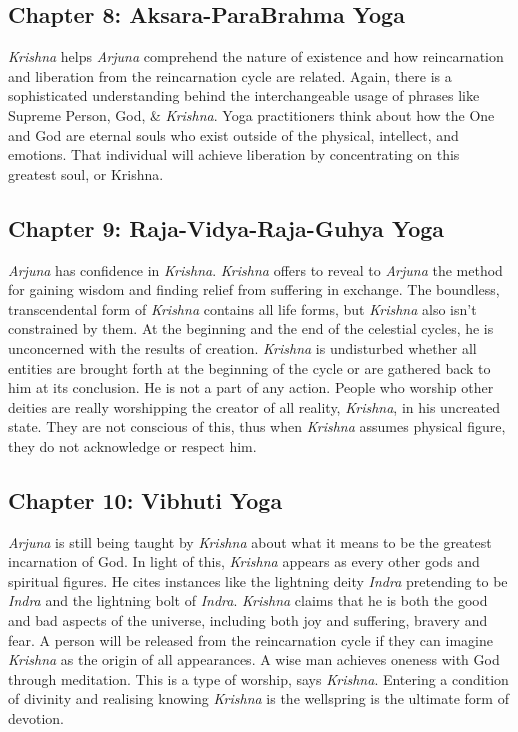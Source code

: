 \documentclass[runningheads]{llncs}
\begin{document}
\subsection{Chapter 8: Aksara-ParaBrahma Yoga}
\textit{Krishna} helps \textit{Arjuna} comprehend the nature of existence and how reincarnation and liberation from the reincarnation cycle are related. Again, there is a sophisticated understanding behind the interchangeable usage of phrases like Supreme Person, God, \& \textit{Krishna}. Yoga practitioners think about how the One and God are eternal souls who exist outside of the physical, intellect, and emotions. That individual will achieve liberation by concentrating on this greatest soul, or Krishna.
\subsection{Chapter 9: Raja-Vidya-Raja-Guhya Yoga}
\textit{Arjuna} has confidence in \textit{Krishna}. \textit{Krishna} offers to reveal to \textit{Arjuna} the method for gaining wisdom and finding relief from suffering in exchange. The boundless, transcendental form of \textit{Krishna} contains all life forms, but \textit{Krishna} also isn't constrained by them. At the beginning and the end of the celestial cycles, he is unconcerned with the results of creation. \textit{Krishna} is undisturbed whether all entities are brought forth at the beginning of the cycle or are gathered back to him at its conclusion. He is not a part of any action. People who worship other deities are really worshipping the creator of all reality, \textit{Krishna}, in his uncreated state. They are not conscious of this, thus when \textit{Krishna} assumes physical figure, they do not acknowledge or respect him.
\subsection{Chapter 10: 	Vibhuti Yoga}
\textit{Arjuna} is still being taught by \textit{Krishna} about what it means to be the greatest incarnation of God. In light of this, \textit{Krishna} appears as every other gods and spiritual figures. He cites instances like the lightning deity \textit{Indra} pretending to be \textit{Indra} and the lightning bolt of \textit{Indra}. \textit{Krishna} claims that he is both the good and bad aspects of the universe, including both joy and suffering, bravery and fear. A person will be released from the reincarnation cycle if they can imagine \textit{Krishna} as the origin of all appearances. A wise man achieves oneness with God through meditation. This is a type of worship, says \textit{Krishna}. Entering a condition of divinity and realising knowing \textit{Krishna} is the wellspring is the ultimate form of devotion.
\end{document}
